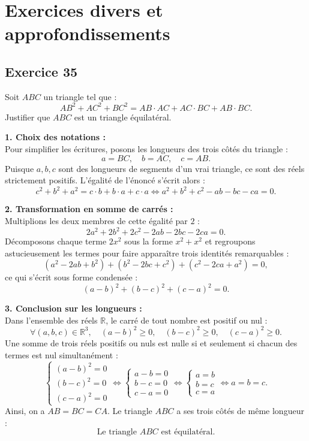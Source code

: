 \documentclass[11pt,a4paper]{article}
\begin{document}
\section{Exercices divers et approfondissements}

\subsection*{Exercice 35}
Soit $ABC$ un triangle tel que :
\[
AB^2 + AC^2 + BC^2 = AB \cdot AC + AC \cdot BC + AB \cdot BC.
\]
Justifier que $ABC$ est un triangle équilatéral.

\begin{correctionbox}
\textbf{1. Choix des notations :}\\
Pour simplifier les écritures, posons les longueurs des trois côtés du triangle :
\[
a = BC, \quad b = AC, \quad c = AB.
\]
Puisque $a, b, c$ sont des longueurs de segments d'un vrai triangle, ce sont des réels strictement positifs.
L'égalité de l'énoncé s'écrit alors :
\[
c^2 + b^2 + a^2 = c \cdot b + b \cdot a + c \cdot a \iff a^2 + b^2 + c^2 - ab - bc - ca = 0.
\]

\textbf{2. Transformation en somme de carrés :}\\
Multiplions les deux membres de cette égalité par $2$ :
\[
2a^2 + 2b^2 + 2c^2 - 2ab - 2bc - 2ca = 0.
\]
Décomposons chaque terme $2x^2$ sous la forme $x^2 + x^2$ et regroupons astucieusement les termes pour faire apparaître trois identités remarquables :
\[
(a^2 - 2ab + b^2) + (b^2 - 2bc + c^2) + (c^2 - 2ca + a^2) = 0,
\]
ce qui s'écrit sous forme condensée :
\[
(a - b)^2 + (b - c)^2 + (c - a)^2 = 0.
\]

\textbf{3. Conclusion sur les longueurs :}\\
Dans l'ensemble des réels $\mathbb{R}$, le carré de tout nombre est positif ou nul :
\[
\forall (a, b, c) \in \mathbb{R}^3, \quad (a - b)^2 \ge 0, \quad (b - c)^2 \ge 0, \quad (c - a)^2 \ge 0.
\]
Une somme de trois réels positifs ou nuls est nulle si et seulement si chacun des termes est nul simultanément :
\[
\begin{cases}
(a - b)^2 = 0 \\
(b - c)^2 = 0 \\
(c - a)^2 = 0
\end{cases}
\iff
\begin{cases}
a - b = 0 \\
b - c = 0 \\
c - a = 0
\end{cases}
\iff
\begin{cases}
a = b \\
b = c \\
c = a
\end{cases}
\iff a = b = c.
\]
Ainsi, on a $AB = BC = CA$. Le triangle $ABC$ a ses trois côtés de même longueur :
\[
\boxed{\text{Le triangle } ABC \text{ est équilatéral.}}
\]
\end{correctionbox}
\end{document}
